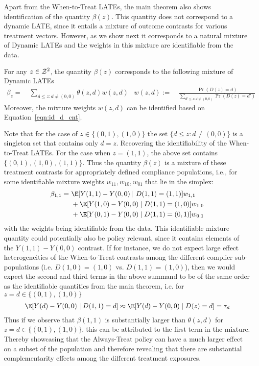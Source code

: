 Apart from the When-to-Treat LATEs, the main theorem also shows identification of the quantity $\beta(z)$. This quantity does not correspond to a dynamic LATE, since it entails a mixture of outcome contrasts for various treatment vectors. However, as we show next it corresponds to a natural mixture of Dynamic LATEs and the weights in this mixture are identifiable from the data.
\begin{proposition}\label{prop:mixture}
For any $z\in {\cal Z}^2$, the quantity $\beta(z)$ corresponds to the following mixture of Dynamic LATEs
\begin{align*}
\beta_z 
=~&\sum_{d \leq z:d\neq (0,0)} \theta(z,d) w(z,d) &
w(z,d) :=~&  \frac{\Pr(D(z)=d)}{\sum_{d'\leq z: d\neq (0,0)}\Pr(D(z)=d')}
\end{align*}
Moreover, the mixture weights $w(z,d)$ can be identified based on Equation~\eqref{eqn:id_d_cnt}.
\end{proposition}
Note that for the case of $z\in \{(0,1), (1,0)\}$ the set $\{d \leq z:d\neq (0,0)\}$ is a singleton set that contains only $d=z$. Recovering the identifiability of the When-to-Treat LATEs. For the case when $z=(1,1)$, the above set contains $\{(0,1), (1,0), (1,1)\}$. Thus the quantity $\beta(z)$ is a mixture of these treatment contrasts for appropriately defined compliance populations, i.e., for some identifiable mixture weights $w_{11}, w_{10}, w_{01}$ that lie in the simplex:
\begin{align}
    \beta_{1,1} =~& \E[Y(1,1)-Y(0,0)\mid D(1,1)=(1,1)] w_{1,1}\\
    ~& + \E[Y(1,0)-Y(0,0)\mid D(1,1)=(1,0)] w_{1,0} \\
    ~& + \E[Y(0,1)-Y(0,0)\mid D(1,1)=(0,1)] w_{0,1}
\end{align}
with the weights being identifiable from the data. This identifiable mixture quantity could potentially also be policy relevant, since it contains elements of the $Y(1,1)-Y(0,0)$ contrast. If for instance, we do not expect large effect heterogeneities of the When-to-Treat contrasts among the different complier sub-populations (i.e. $D(1,0)=(1,0)$ vs. $D(1,1)=(1,0)$), then we would expect the second and third terms in the above summand to be of the same order as the identifiable quantities from the main theorem, i.e. for $z=d\in \{(0,1),(1,0)\}$
\begin{align}
    \E[Y(d) - Y(0,0) \mid D(1,1)=d] \approx \E[Y(d) - Y(0,0) \mid D(z)=d] = \tau_d
\end{align}
Thus if we observe that $\beta(1,1)$ is substantially larger than $\theta(z,d)$ for $z=d\in \{(0,1),(1,0)\}$, this can be attributed to the first term in the mixture. Thereby showcasing that the Always-Treat policy can have a much larger effect on a subset of the population and therefore revealing that there are substantial complementarity effects among the different treatment exposures. 


